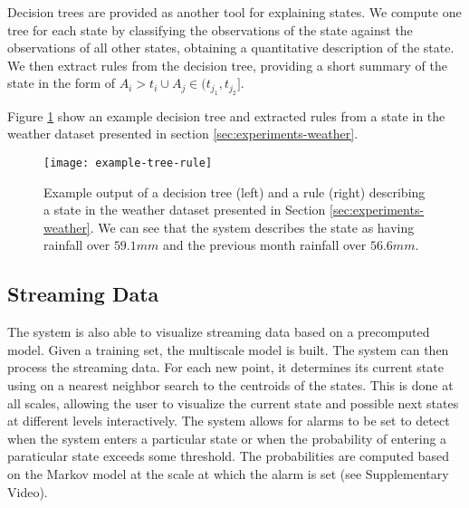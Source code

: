 Decision trees are provided as another tool for explaining states. We compute one tree for each
state by classifying the observations of the state against the observations of all other states,
obtaining a quantitative description of the state. We then extract rules from the decision tree,
providing a short summary of the state in the form of $A_i > t_i \cup A_j \in (t_{j_1}, t_{j_2}]$.

Figure \ref{fig:example-decision-tree-and-rule} show an example decision tree and extracted rules
from a state in the weather dataset presented in section \ref{sec:experiments-weather}.

\begin{figure}[h!]
	\centering
	\texttt{[image: example-tree-rule]}
	\caption{Example output of a decision tree (left) and a rule (right) describing a state in the weather dataset presented in Section \ref{sec:experiments-weather}. We can see that the system describes the state as having rainfall over $59.1 mm$ and the previous month rainfall over $56.6 mm$.}
	\label{fig:example-decision-tree-and-rule}
\end{figure}

\subsection{Streaming Data}
The system is also able to visualize streaming data based on a precomputed model. Given a training set, the multiscale model is built. The system can then process the streaming data. For each new point, it determines its current state using on a nearest neighbor search to the centroids of the states. This is done at all scales, allowing the user to visualize the current state and possible next states at different levels interactively. The system allows for alarms to be set to detect when the system enters a particular state or when the probability of entering a paraticular state exceeds some threshold. The probabilities are computed based on the Markov model at the scale at which the alarm is set 
(see Supplementary Video).

\iffalse
\begin{figure}[h!]
	\centering
	\begin{subfigure}{.3\columnwidth}
	  	\centering
	  	\texttt{[image: example-rule]}
  		\label{fig:example-rule}
	\end{subfigure}
	\begin{subfigure}{0.9\columnwidth}
	  	\centering
	  	\texttt{[image: example-decision-tree]}
	  	\label{fig:example-decision-tree}
	\end{subfigure}
	\caption{Example output of a decision tree (right) and a rule (left) describing a state in the weather dataset presented in Section \ref{sec:experiments-weather}. We can see that the system describes the state as having rainfall over $59.1 mm$ and the previous month rainfall over $56.6 mm$.}
	\label{fig:example-decision-tree-and-rule}
\end{figure}
\fi

